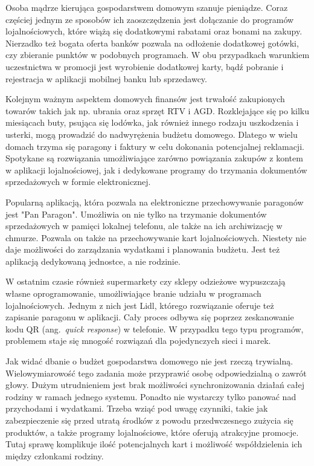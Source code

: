 Osoba mądrze kierująca gospodarstwem domowym szanuje pieniądze. Coraz częściej jednym ze sposobów ich zaoszczędzenia jest dołączanie do programów lojalnościowych, które wiążą się dodatkowymi rabatami oraz bonami na zakupy. Nierzadko też bogata oferta banków pozwala na odłożenie dodatkowej gotówki, czy zbieranie punktów w podobnych programach. W obu przypadkach warunkiem uczestnictwa w promocji jest wyrobienie dodatkowej karty, bądź pobranie i rejestracja w aplikacji mobilnej banku lub sprzedawcy.

Kolejnym ważnym aspektem domowych finansów jest trwałość zakupionych towarów takich jak np. ubrania oraz sprzęt RTV i AGD. Rozklejające się po kilku miesiącach buty, psująca się lodówka, jak również innego rodzaju uszkodzenia i usterki, mogą prowadzić do nadwyrężenia budżetu domowego. Dlatego w wielu domach trzyma się paragony i faktury w celu dokonania potencjalnej reklamacji. Spotykane są rozwiązania umożliwiające zarówno powiązania zakupów z kontem w aplikacji lojalnościowej, jak i dedykowane programy do trzymania dokumentów sprzedażowych w formie elektronicznej.

Popularną aplikacją, która pozwala na elektroniczne przechowywanie paragonów jest "Pan Paragon". Umożliwia on nie tylko na trzymanie dokumentów sprzedażowych w pamięci lokalnej telefonu, ale także na ich archiwizację w chmurze. Pozwala on także na przechowywanie kart lojalnościowych. Niestety nie daje możliwości do zarządzania wydatkami i planowania budżetu. Jest też aplikacją dedykowaną jednostce, a nie rodzinie.

W ostatnim czasie również supermarkety czy sklepy odzieżowe wypuszczają własne oprogramowanie, umożliwiające branie udziału w programach lojalnościowych. Jednym z nich jest Lidl, którego rozwiązanie oferuje też zapisanie paragonu w aplikacji. Cały proces odbywa się poprzez zeskanowanie kodu QR (ang.~\emph{quick response}) w telefonie. W przypadku tego typu programów, problemem staje się mnogość rozwiązań dla pojedynczych sieci i marek.

Jak widać dbanie o budżet gospodarstwa domowego nie jest rzeczą trywialną. Wielowymiarowość tego zadania może przyprawić osobę odpowiedzialną o zawrót głowy. Dużym utrudnieniem jest brak możliwości synchronizowania działań całej rodziny w ramach jednego systemu. Ponadto nie wystarczy tylko panować nad przychodami i wydatkami. Trzeba wziąć pod uwagę czynniki, takie jak zabezpieczenie się przed utratą środków z powodu przedwczesnego zużycia się produktów, a także  programy lojalnościowe, które oferują atrakcyjne promocje. Tutaj sprawę komplikuje ilość potencjalnych kart i możliwość współdzielenia ich między członkami rodziny. 

